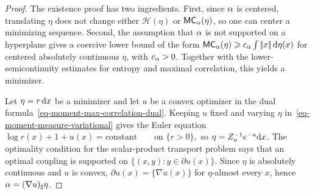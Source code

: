 \begin{proof}
The existence proof has two ingredients. First, since $\alpha$ is centered, translating $\eta$ does not change either $\mathcal H(\eta)$ or $\mathsf{MC}_\alpha(\eta)$, so one can center a minimizing sequence. Second, the assumption that $\alpha$ is not supported on a hyperplane gives a coercive lower bound of the form $\mathsf{MC}_\alpha(\eta)\geqslant c_\alpha\int|\!| x |\!|\,\mathrm{d}\eta(x)$ for centered absolutely continuous $\eta$, with $c_\alpha>0$. Together with the lower-semicontinuity estimates for entropy and maximal correlation, this yields a minimizer.

Let $\eta=r\,\mathrm{d} x$ be a minimizer and let $u$ be a convex optimizer in the dual formula~\eqref{eq-moment-max-correlation-dual}. Keeping $u$ fixed and varying $\eta$ in~\eqref{eq-moment-measure-variational} gives the Euler equation
\(\log r(x)+1+u(x)=\mathrm{constant} \qquad\text{on }\{r>0\},\)
so $\eta=Z_u^{-1}e^{-u}\mathrm{d} x$. The optimality condition for the scalar-product transport problem says that an optimal coupling is supported on $\{(x,y):y\in\partial u(x)\}$. Since $\eta$ is absolutely continuous and $u$ is convex, $\partial u(x)=\{\nabla u(x)\}$ for $\eta$-almost every $x$, hence $\alpha=(\nabla u)_\sharp\eta$.


\end{proof}
